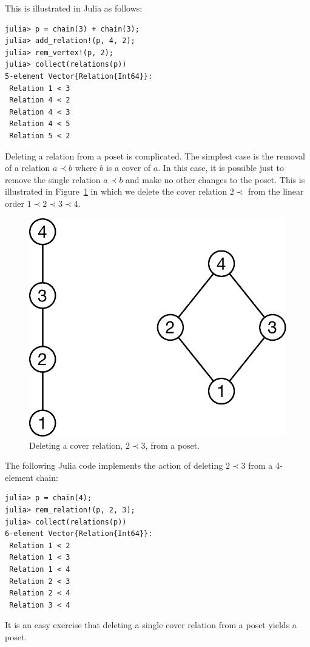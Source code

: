 \documentclass[12pt]{article}
\begin{document}
This is illustrated in Julia as follows:
\begin{verbatim}
julia> p = chain(3) + chain(3);
julia> add_relation!(p, 4, 2);
julia> rem_vertex!(p, 2);
julia> collect(relations(p))
5-element Vector{Relation{Int64}}:
 Relation 1 < 3
 Relation 4 < 2
 Relation 4 < 3
 Relation 4 < 5
 Relation 5 < 2
\end{verbatim}

\newpage
{}

Deleting a relation from a poset is complicated. The simplest case is
the removal of a relation $a \prec b$ where $b$ is a cover of $a$. In
this case, it is possible just to remove the single relation $a \prec
b$ and make no other changes to the poset. This is illustrated in
Figure~\ref{fig:cover-edge-deletion} in which we delete the cover
relation $2\prec$ from the linear order $1\prec2\prec3\prec4$. 
\begin{figure}[h]
  \begin{framed}
    \begin{center}
      \includegraphics[scale=0.4]{cover-edge-deletion}
    \end{center}
    \caption{Deleting a cover relation, $2\prec3$, from a poset.}
    \label{fig:cover-edge-deletion}
  \end{framed}
\end{figure}

The following Julia code implements the action of deleting $2 \prec 3$
from a 4-element chain:
\begin{verbatim}
julia> p = chain(4);
julia> rem_relation!(p, 2, 3);
julia> collect(relations(p))
6-element Vector{Relation{Int64}}:
 Relation 1 < 2
 Relation 1 < 3
 Relation 1 < 4
 Relation 2 < 3
 Relation 2 < 4
 Relation 3 < 4
\end{verbatim}
It is an easy exercise that deleting a single cover relation from a
poset yields a poset. 
\end{document}
